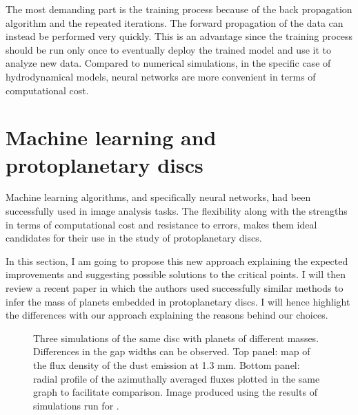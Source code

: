 \documentclass[a4paper,10pt]{report}
\begin{document}
The most demanding part is the training process because of the back propagation 
algorithm and the repeated iterations.
The forward propagation of the data can instead be performed  very quickly.
This is an advantage since the training process should be run only once to eventually deploy the trained model
and use it to analyze new data. Compared to numerical simulations, in the specific case of hydrodynamical models, 
neural networks are more convenient in terms of computational cost.

\section{Machine learning and protoplanetary discs}

Machine learning algorithms, and specifically neural networks, had been successfully used in image analysis tasks.
The flexibility along with the strengths in terms of computational cost and resistance to 
errors, makes them ideal candidates for their use in the study of protoplanetary discs.

In this section, I am going to propose this new approach explaining the expected improvements and 
suggesting possible solutions to the critical points. I will then review a recent paper in which the 
authors used successfully similar methods to infer the mass of planets embedded in protoplanetary discs.
I will hence highlight the differences with our approach explaining the reasons behind our choices.

\begin{figure}
    \begin{center}
        \scalebox{0.5}{}
        \scalebox{0.6}{}
    \end{center}
    \caption{Three simulations of the same disc with planets of different masses.
    Differences in the gap widths can be observed.
    Top panel: map of the flux density of the dust emission at 1.3 mm. Bottom panel:
    radial profile of the azimuthally averaged fluxes plotted in the same graph to facilitate comparison.
    Image produced using the results of simulations run for \citet{dstauv}.}
\end{figure}
\end{document}
